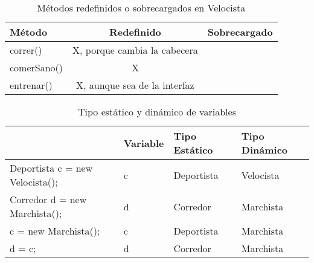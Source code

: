 \documentclass[a4paper,12pt]{article}
\begin{document}
\begin{table}[H]
    \centering
    \begin{tabular}{|l|c|c|}
    \hline
    \textbf{Método} & \textbf{Redefinido} & \textbf{Sobrecargado} \\ \hline
    correr() & X, porque cambia la cabecera &  \\ \hline
    comerSano() & X &  \\ \hline
    entrenar() & X, aunque sea de la interfaz &  \\ \hline
    \end{tabular}
    \caption{Métodos redefinidos o sobrecargados en Velocista}
\end{table}

\begin{table}[H]
    \centering
    \begin{tabular}{|l|l|l|l|}
    \hline
    & \textbf{Variable} & \textbf{Tipo Estático} & \textbf{Tipo Dinámico} \\ \hline
    Deportista c = new Velocista(); & c& Deportista & Velocista \\ \hline
    Corredor d = new Marchista(); &d &Corredor & Marchista \\ \hline
    c = new Marchista(); &c& Deportista & Marchista \\ \hline
    d = c; & d&Corredor & Marchista \\ \hline
    \end{tabular}
    \caption{Tipo estático y dinámico de variables}
\end{table}
\end{document}
